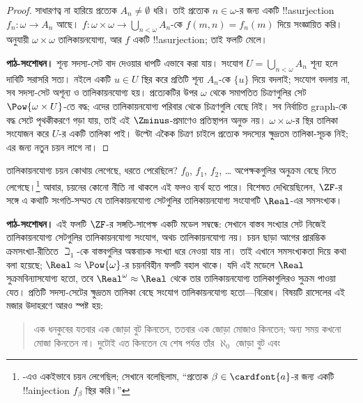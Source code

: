 \documentclass[../../../include/open-logic-section]{subfiles}
\begin{document}
\begin{ex}
\begin{proof}
সাধারণত্ব না হারিয়ে প্রত্যেক
$A_n\neq\emptyset$ ধরি। তাই প্রত্যেক
$n\in\omega$-র জন্য একটি !!a{surjection}
$f_n\colon\omega\to A_n$ আছে।
$f\colon\omega\times\omega\to
\bigcup_{n<\omega}A_n$-কে
$f(m,n)=f_n(m)$ দিয়ে সংজ্ঞায়িত করি।
অনুযায়ী $\omega\times\omega$
তালিকায়নযোগ্য, আর $f$ একটি
!!a{surjection}; তাই ফলটি মেলে।
\par\noindent\textbf{পাঠ-সংশোধন।} শূন্য সদস্য-সেট বাদ দেওয়ার ধাপটি এভাবে করা যায়। সংযোগ
$U=\bigcup_{n<\omega}A_n$ শূন্য হলে দাবিটি সরাসরি সত্য।
নইলে একটি $u\in U$ স্থির করে প্রতিটি শূন্য $A_n$-কে
$\{u\}$ দিয়ে বদলাই; সংযোগ বদলায় না, সব সদস্য-সেট অশূন্য
ও তালিকায়নযোগ্য হয়। প্রত্যেকটির উপর $\omega$ থেকে
সমাপতিত চিত্রণগুলির সেট $\Pow{\omega\times U}$-তে বদ্ধ;
এদের তালিকায়নযোগ্য পরিবার থেকে চিত্রণগুলি বেছে নিই।
সব নির্বাচিত graph-কে বদ্ধ সেটে পৃথকীকরণে গড়া যায়,
তাই এই $\Zminus$-প্রমাণেও প্রতিস্থাপন অনুক্ত নয়।
$\omega\times\omega$-র স্থির তালিকা সংযোজন করে $U$-র
একটি তালিকা পাই। উল্টো একৈক চিত্রণ চাইলে প্রত্যেক সদস্যের
ক্ষুদ্রতম তালিকা-সূচক নিই; এর জন্য নতুন চয়ন লাগে না।
\end{proof}
\noindent
তালিকায়নযোগ্য চয়ন কোথায় লেগেছে,
ধরতে পেরেছিলে? $f_0$, $f_1$, $f_2$, \dots
অপেক্ষকগুলির অনুক্রম বেছে নিতে লেগেছে।\footnote{
-এও
একইভাবে চয়ন লেগেছিল; সেখানে বলেছিলাম,
``প্রত্যেক $\beta\in\cardfont{a}$-র জন্য একটি
!!a{injection} $f_\beta$ স্থির করি।''}
আবার, চয়নের কোনো নীতি না থাকলে এই ফলও
ব্যর্থ হতে পারে। বিশেষত
\citet{FefermanLevy1963} দেখিয়েছিলেন,
$\ZF$-র সঙ্গে এ কথাটি সংগতি-সম্মত যে
তালিকায়নযোগ্য সেটগুলির তালিকায়নযোগ্য
সংযোগটি $\Real$-এর সমসংখ্যক।
\par\noindent\textbf{পাঠ-সংশোধন।} এই ফলটি $\ZF$-র সঙ্গতি-সাপেক্ষ একটি মডেল সম্বন্ধে:
সেখানে বাস্তব সংখ্যার সেট নিজেই তালিকায়নযোগ্য সেটগুলির
তালিকায়নযোগ্য সংযোগ, অথচ তালিকায়নযোগ্য নয়। চয়ন ছাড়া
আগের প্রারম্ভিক ক্রমসংখ্যা-রীতিতে $\beth_1$-কে বাস্তবগুলির
অঙ্কবাচক সংখ্যা ধরে নেওয়া যায় না। তাই এখানে সমসংখ্যকতা
দিয়ে কথা বলা হয়েছে; $\Real\approx\Pow{\omega}$-র
চয়নবিহীন ফলটি বহাল থাকে। যদি এই মডেলে $\Real$ সুক্রমবিন্যাসযোগ্য
হতো, তবে $\Real^\omega\approx\Real$ থেকে তার তালিকায়নযোগ্য
তালিকাগুলিরও সুক্রম পাওয়া যেত। প্রতিটি সদস্য-সেটের ক্ষুদ্রতম
তালিকা বেছে সংযোগ তালিকায়নযোগ্য হতো—বিরোধ।
বিষয়টি রাসেলের এই মজার উদাহরণে আরও
স্পষ্ট হয়:
\begin{quote}
  এক ধনকুবের যতবার এক জোড়া বুট কিনতেন,
  ততবার এক জোড়া মোজাও কিনতেন; অন্য সময়
  কখনো মোজা কিনতেন না। দুটোই এত কিনতেন যে
  শেষ পর্যন্ত তাঁর $\aleph_0$ জোড়া বুট এবং

\end{quote}
\end{ex}
\end{document}
